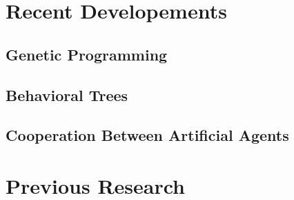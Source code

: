\section{Recent Developements}
\subsection{Genetic Programming}
\subsection{Behavioral Trees}
\subsection{Cooperation Between Artificial Agents}
\section{Previous Research}
